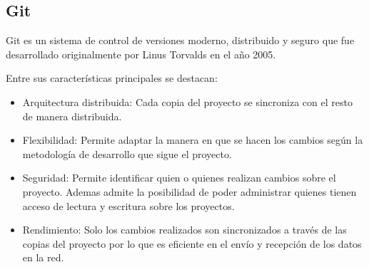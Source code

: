 \subsection{Git}
Git es un sistema de control de versiones moderno, distribuido y seguro que fue desarrollado originalmente por Linus Torvalds en el año 2005. 

Entre sus características principales se destacan:
\begin{itemize}
\item Arquitectura distribuida: Cada copia del proyecto se sincroniza con el resto de manera distribuida.
\item Flexibilidad: Permite adaptar la manera en que se hacen los cambios según la metodología de desarrollo que sigue el proyecto. 
\item Seguridad: Permite identificar quien o quienes realizan cambios sobre el proyecto. Ademas admite la posibilidad de poder administrar quienes tienen acceso de lectura y escritura sobre los proyectos.
\item Rendimiento: Solo los cambios realizados son sincronizados a través de las copias del proyecto por lo que es eficiente en el envío y recepción de los datos en la red. 
\end{itemize}

